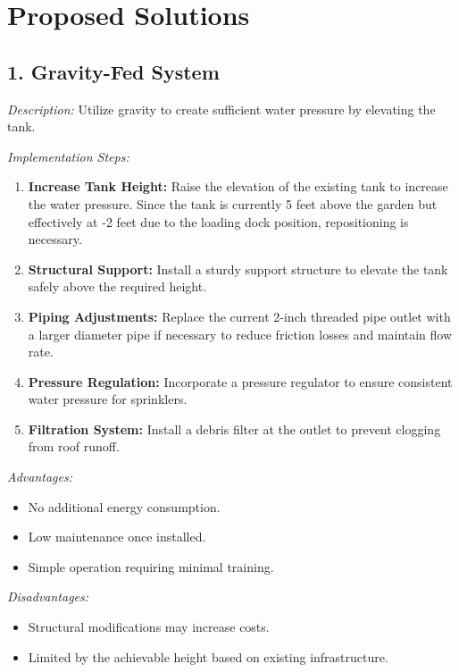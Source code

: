 \documentclass[12pt]{article}
\begin{document}
\newpage
\section*{Proposed Solutions}

\subsection*{1. Gravity-Fed System}

\noindent\textit{Description:} Utilize gravity to create sufficient water pressure by elevating the tank.

\noindent\textit{Implementation Steps:}
\begin{enumerate}[noitemsep, topsep=0pt]
\item \textbf{Increase Tank Height:} Raise the elevation of the existing tank to increase the water pressure. Since the tank is currently 5 feet above the garden but effectively at -2 feet due to the loading dock position, repositioning is necessary.
\item \textbf{Structural Support:} Install a sturdy support structure to elevate the tank safely above the required height.
\item \textbf{Piping Adjustments:} Replace the current 2-inch threaded pipe outlet with a larger diameter pipe if necessary to reduce friction losses and maintain flow rate.
\item \textbf{Pressure Regulation:} Incorporate a pressure regulator to ensure consistent water pressure for sprinklers.
\item \textbf{Filtration System:} Install a debris filter at the outlet to prevent clogging from roof runoff.
\end{enumerate}

\noindent\textit{Advantages:}
\begin{itemize}[noitemsep, topsep=0pt]
\item No additional energy consumption.
\item Low maintenance once installed.
\item Simple operation requiring minimal training.
\end{itemize}

\noindent\textit{Disadvantages:}
\begin{itemize}[noitemsep, topsep=0pt]
\item Structural modifications may increase costs.
\item Limited by the achievable height based on existing infrastructure.
\end{itemize}
\newpage
\end{document}
